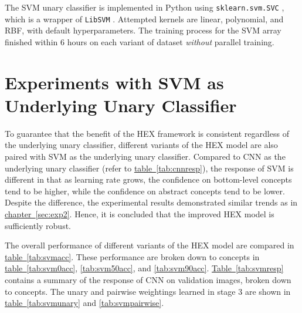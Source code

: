 \documentclass[11pt,a4paper]{book}
\begin{document}
The SVM unary classifier is implemented in Python using \texttt{sklearn.svm.SVC} \cite{sklearn}, which is a wrapper of \texttt{LibSVM} \cite{libsvm}. Attempted kernels are linear, polynomial, and RBF, with default hyperparameters. The training process for the SVM array finished within 6 hours on each variant of dataset \emph{without} parallel training.

\section{Experiments with SVM as Underlying Unary Classifier}
\label{sec:svm}

To guarantee that the benefit of the HEX framework is consistent regardless of the underlying unary classifier, different variants of the HEX model are also paired with SVM as the underlying unary classifier. Compared to CNN as the underlying unary classifier (refer to \hyperref[tab:cnnresp]{table~\ref{tab:cnnresp}}), the response of SVM is different in that as learning rate grows, the confidence on bottom-level concepts tend to be higher, while the confidence on abstract concepts tend to be lower. Despite the difference, the experimental results demonstrated similar trends as in \hyperref[sec:exp2]{chapter~\ref{sec:exp2}}. Hence, it is concluded that the improved HEX model is sufficiently robust.

The overall performance of different variants of the HEX model are compared in \hyperref[tab:svmacc]{table~\ref{tab:svmacc}}. These performance are broken down to concepts in \hyperref[tab:svm0acc]{table~\ref{tab:svm0acc}}, \ref{tab:svm50acc}, and \ref{tab:svm90acc}. \hyperref[tab:svmresp]{Table~\ref{tab:svmresp}} contains a summary of the response of CNN on validation images, broken down to concepts. The unary and pairwise weightings learned in stage 3 are shown in \hyperref[tab:svmunary]{table~\ref{tab:svmunary}} and \ref{tab:svmpairwise}.
\end{document}
